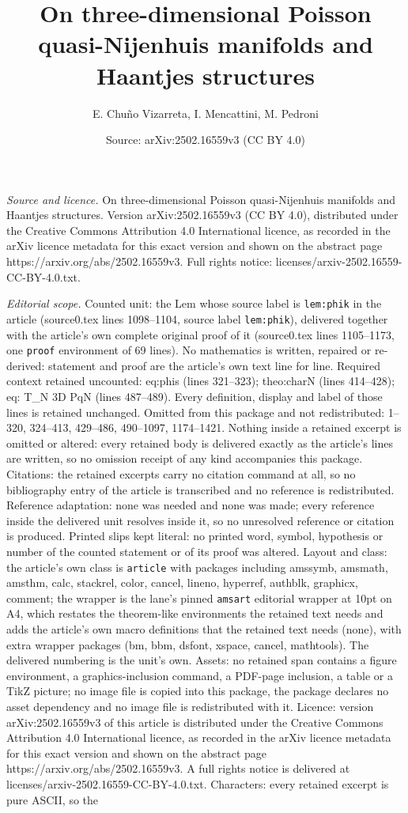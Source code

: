 \documentclass[10pt,a4paper]{amsart}
\title[On three-dimensional Poisson quasi-Nijenhuis manifolds and H]{On three-dimensional Poisson quasi-Nijenhuis manifolds and Haantjes structures}
\author{E. Chu\~no Vizarreta, I. Mencattini, M. Pedroni}
\date{Source: arXiv:2502.16559v3 (CC BY 4.0)}
\begin{document}
\maketitle

\noindent\emph{Source and licence.} On three-dimensional Poisson quasi-Nijenhuis manifolds and Haantjes structures. Version arXiv:2502.16559v3 (CC BY 4.0), distributed under the Creative Commons Attribution 4.0 International licence, as recorded in the arXiv licence metadata for this exact version and shown on the abstract page https://arxiv.org/abs/2502.16559v3. Full rights notice: licenses/arxiv-2502.16559-CC-BY-4.0.txt.\par\smallskip

\noindent\textit{Editorial scope.} Counted unit: the Lem whose source label is \texttt{lem:phik} in the article (source0.tex lines 1098--1104, source label \texttt{lem:phik}), delivered together with the article's own complete original proof of it (source0.tex lines 1105--1173, one \texttt{proof} environment of 69 lines). No mathematics is written, repaired or re-derived: statement and proof are the article's own text line for line. Required context retained uncounted: eq:phis (lines 321--323); theo:charN (lines 414--428); eq: T\_N 3D PqN (lines 487--489). Every definition, display and label of those lines is retained unchanged. Omitted from this package and not redistributed: 1--320, 324--413, 429--486, 490--1097, 1174--1421. Nothing inside a retained excerpt is omitted or altered: every retained body is delivered exactly as the article's lines are written, so no omission receipt of any kind accompanies this package. Citations: the retained excerpts carry no citation command at all, so no bibliography entry of the article is transcribed and no reference is redistributed. Reference adaptation: none was needed and none was made; every reference inside the delivered unit resolves inside it, so no unresolved reference or citation is produced. Printed slips kept literal: no printed word, symbol, hypothesis or number of the counted statement or of its proof was altered. Layout and class: the article's own class is \texttt{article} with packages including amssymb, amsmath, amsthm, calc, stackrel, color, cancel, lineno, hyperref, authblk, graphicx, comment; the wrapper is the lane's pinned \texttt{amsart} editorial wrapper at 10pt on A4, which restates the theorem-like environments the retained text needs and adds the article's own macro definitions that the retained text needs (none), with extra wrapper packages (bm, bbm, dsfont, xspace, cancel, mathtools). The delivered numbering is the unit's own. Assets: no retained span contains a figure environment, a graphics-inclusion command, a PDF-page inclusion, a table or a TikZ picture; no image file is copied into this package, the package declares no asset dependency and no image file is redistributed with it. Licence: version arXiv:2502.16559v3 of this article is distributed under the Creative Commons Attribution 4.0 International licence, as recorded in the arXiv licence metadata for this exact version and shown on the abstract page https://arxiv.org/abs/2502.16559v3. A full rights notice is delivered at licenses/arxiv-2502.16559-CC-BY-4.0.txt. Characters: every retained excerpt is pure ASCII, so the 
\end{document}
